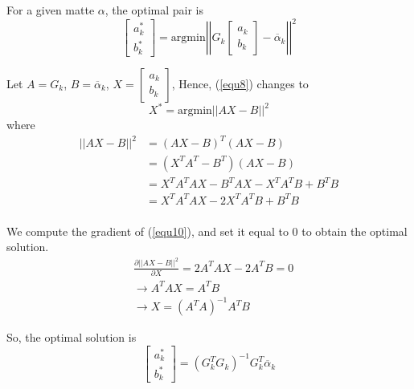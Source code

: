 \documentclass[journal]{IEEEtran}
\begin{document}
For a given matte $\alpha$, the optimal pair is 
\begin{equation}
    \begin{bmatrix}
    a_{k}^{*} \\ b_{k}^{*}
    \end{bmatrix}
    = \text{argmin} \left| \left| 
        G_{k} \begin{bmatrix}
        a_k \\ b_k
        \end{bmatrix} - \overline{\alpha}_{k}
    \right| \right|^2
    \label{equ8}
\end{equation}

Let $A = G_k$, $B = \overline{\alpha}_k$, $X = \begin{bmatrix} a_k \\ b_k \end{bmatrix}$, Hence, (\ref{equ8}) changes to 
\begin{equation}
    X^* = \text{argmin} \left| \left| AX-B  \right| \right|^2
    \label{equ9}
\end{equation}
where
\begin{equation}
    \begin{aligned}
        \left|\left| AX-B \right|\right|^2 &= (AX-B)^{T}(AX-B) \\
                                           &= (X^{T}A^{T} - B^{T})(AX-B) \\
                                           &= X^{T}A^{T}AX - B^{T}AX - X^{T}A^{T}B + B^{T}B \\
                                           &= X^{T}A^{T}AX - 2X^{T}A^{T}B + B^{T}B \\
    \end{aligned}
    \label{equ10}
\end{equation}

We compute the gradient of (\ref{equ10}), and set it equal to 0 to obtain the optimal solution.
\begin{equation}
    \begin{aligned}
        &\frac{\partial ||AX-B||^2}{\partial X} = 2A^{T}AX - 2A^{T}B = 0 \\
        &\rightarrow A^{T}AX = A^{T}B \\
        &\rightarrow X = (A^{T}A)^{-1}A^{T}B
    \end{aligned}
    \label{equ11}
\end{equation}

So, the optimal solution is 
\begin{equation}
    \begin{bmatrix}
    a_{k}^{*} \\ b_{k}^{*}
    \end{bmatrix} 
    = (G_{k}^{T}G_{k})^{-1}G_{k}^{T}\overline{\alpha}_k
    \label{equ12}
\end{equation}
\end{document}

